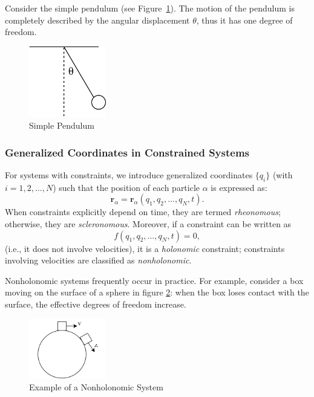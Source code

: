 Consider the simple pendulum (see Figure~\ref{fig:1-1-2}). The motion of the pendulum is completely described by the angular displacement \(\theta\), thus it has one degree of freedom.

\begin{figure}[ht]
    \centering
    \includegraphics[width=0.3\textwidth]{images/1-1-2.png}
    \caption{Simple Pendulum}
    \label{fig:1-1-2}
\end{figure}

\subsubsection*{Generalized Coordinates in Constrained Systems}

For systems with constraints, we introduce generalized coordinates \(\{q_i\}\) (with \(i = 1, 2, \dots, N\)) such that the position of each particle \(\alpha\) is expressed as:
\begin{equation}
    \mathbf{r}_\alpha = \mathbf{r}_\alpha(q_1, q_2, \dots, q_N, t).
\end{equation}
When constraints explicitly depend on time, they are termed \emph{rheonomous}; otherwise, they are \emph{scleronomous}. Moreover, if a constraint can be written as
\[
f(q_1, q_2, \dots, q_N, t) = 0,
\]
(i.e., it does not involve velocities), it is a \emph{holonomic} constraint; constraints involving velocities are classified as \emph{nonholonomic}.

Nonholonomic systems frequently occur in practice. For example, consider a box moving on the surface of a sphere in figure \ref{fig:1-1-3}: when the box loses contact with the surface, the effective degrees of freedom increase.

\begin{figure}[ht]
    \centering
    \includegraphics[width=0.3\textwidth]{images/1-1-3.png}
    \caption{Example of a Nonholonomic System}
    \label{fig:1-1-3}
\end{figure}

